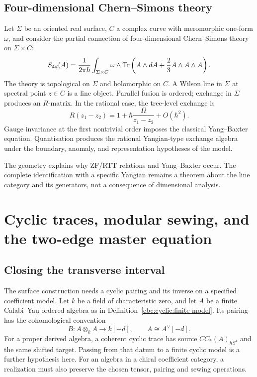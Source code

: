 \section{Four-dimensional Chern--Simons theory}
Let \(\Sigma\) be an oriented real surface, \(C\) a complex curve with meromorphic one-form \(\omega\), and consider the partial connection of four-dimensional Chern--Simons theory on \(\Sigma\times C\):
\[
 S_{4d}(A)=\frac{1}{2\pi\hbar}
 \int_{\Sigma\times C}\omega\wedge
 \operatorname{Tr}\left(A\wedge dA+\frac23A\wedge A\wedge A\right).
\]
The theory is topological on \(\Sigma\) and holomorphic on \(C\).  A Wilson line in \(\Sigma\) at spectral point \(z\in C\) is a line object.  Parallel fusion is ordered; exchange in \(\Sigma\) produces an \(R\)-matrix.  In the rational case, the tree-level exchange is
\[
 R(z_1-z_2)=1+\hbar\frac{\Omega}{z_1-z_2}+O(\hbar^2).
\]
Gauge invariance at the first nontrivial order imposes the classical Yang--Baxter equation.  Quantisation produces the rational Yangian-type exchange algebra under the boundary, anomaly, and representation hypotheses of the model.

The geometry explains why ZF/RTT relations and Yang--Baxter occur.  The complete identification with a specific Yangian remains a theorem about the line category and its generators, not a consequence of dimensional analysis.

\chapter{Cyclic traces, modular sewing, and the two-edge master equation}\label{chap:two-edge}

\section{Closing the transverse interval}
The surface construction needs a cyclic pairing and its inverse on a specified coefficient model.
Let $k$ be a field of characteristic zero, and let $A$ be a finite Calabi--Yau ordered algebra as in Definition~\ref{cbc:cyclic:finite-model}.
Its pairing has the cohomological convention
\[
 B:A\otimes_k A\longrightarrow k[-d],
 \qquad A\cong A^\vee[-d].
\]
For a proper derived algebra, a coherent cyclic trace has source $CC_*(A)_{hS^1}$ and the same shifted target.
Passing from that datum to a finite cyclic model is a further hypothesis here.
For an algebra in a chiral coefficient category, a realization must also preserve the chosen tensor, pairing and sewing operations.

